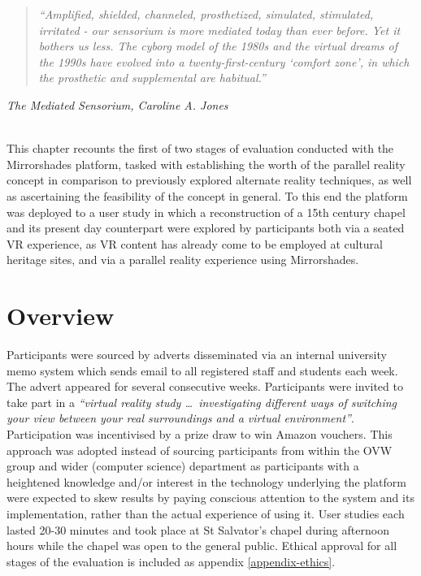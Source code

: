 \begin{quote}
	\textit{``Amplified, shielded, channeled, prosthetized, simulated, stimulated, irritated - our sensorium is more mediated today than ever before. Yet it bothers us less. The cyborg model of the 1980s and the virtual dreams of the 1990s have evolved into a twenty-first-century `comfort zone', in which the prosthetic and supplemental are habitual.''}
\end{quote}
\hfill \textit{The Mediated Sensorium, Caroline A. Jones}
\\
\\


\label{chapter-eval-1}

This chapter recounts the first of two stages of evaluation conducted with the Mirrorshades platform, tasked with establishing the worth of the parallel reality concept in comparison to previously explored alternate reality techniques, as well as ascertaining the feasibility of the concept in general. To this end the platform was deployed to a user study in which a reconstruction of a 15th century chapel and its present day counterpart were explored by participants both via a seated VR experience, as VR content has already come to be employed at cultural heritage sites, and via a parallel reality experience using Mirrorshades.




\section{Overview}



Participants were sourced by adverts disseminated via an internal university memo system which sends email to all registered staff and students each week. The advert appeared for several consecutive weeks. Participants were invited to take part in a \textit{``virtual reality study \ldots\ investigating different ways of switching your view between your real surroundings and a virtual environment''}. Participation was incentivised by a prize draw to win Amazon vouchers. This approach was adopted instead of sourcing participants from within the OVW group and wider (computer science) department as participants with a heightened knowledge and/or interest in the technology underlying the platform were expected to skew results by paying conscious attention to the system and its implementation, rather than the actual experience of using it. User studies each lasted 20-30 minutes and took place at St Salvator's chapel during afternoon hours while the chapel was open to the general public. Ethical approval for all stages of the evaluation is included as appendix \ref{appendix-ethics}.


